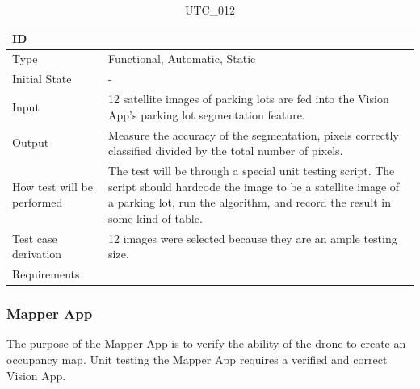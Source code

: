 \documentclass[12pt, titlepage]{article}
\begin{document}
\begin{table}[!h]
\begin{center}
\caption {UTC\_012}
\label{tab:UTC_012}
\begin{tabular}{ | m{3.2cm} | m{12.2cm} | } 
\hline
ID & \nameref{tab:UTC_012} \\ 
\hline
Type &  Functional, Automatic, Static  \\ 
\hline
Initial State & -\\ 
\hline
Input &  12 satellite images of parking lots are fed into the Vision App's parking lot segmentation feature.\\ 
\hline
Output &  Measure the accuracy of the segmentation, pixels correctly classified divided by the total number of pixels. \\ 
\hline
How test will be performed & The test will be through a special unit testing script. The script should hardcode the image to be a satellite image of a parking lot, run the algorithm, and record the result in some kind of table. \\ 
\hline
Test case derivation & 12 images were selected because they are an ample testing size.  \\ 
\hline
Requirements & \nameref{GEN_001} \\ 
\hline
\end{tabular}
\end{center}
\end{table}

\clearpage

\subsubsection{Mapper App}

The purpose of the Mapper App is to verify the ability of the drone to create an occupancy map. Unit testing the Mapper App requires a verified and correct Vision App.
\end{document}
